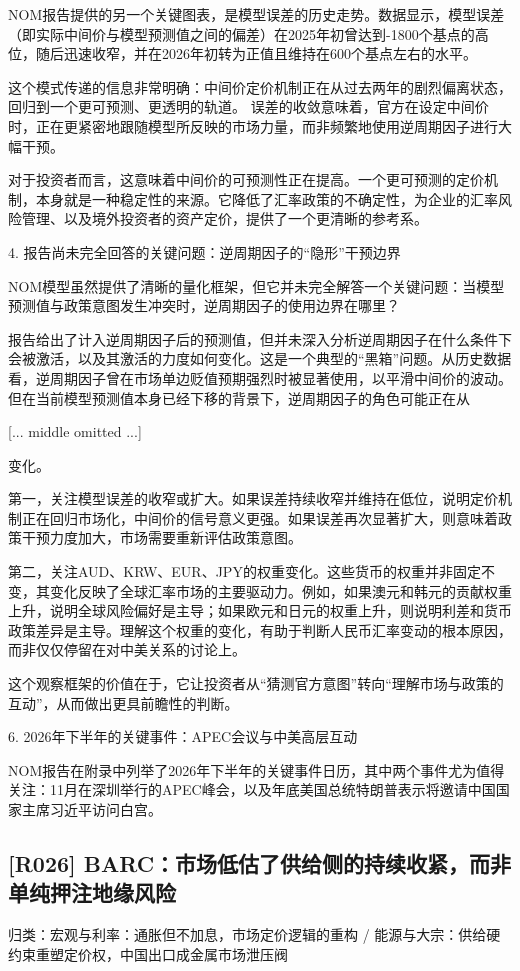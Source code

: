 \documentclass[11pt]{ctexart}
\begin{document}
NOM报告提供的另一个关键图表，是模型误差的历史走势。数据显示，模型误差（即实际中间价与模型预测值之间的偏差）在2025年初曾达到-1800个基点的高位，随后迅速收窄，并在2026年初转为正值且维持在600个基点左右的水平。

这个模式传递的信息非常明确：中间价定价机制正在从过去两年的剧烈偏离状态，回归到一个更可预测、更透明的轨道。 误差的收敛意味着，官方在设定中间价时，正在更紧密地跟随模型所反映的市场力量，而非频繁地使用逆周期因子进行大幅干预。

对于投资者而言，这意味着中间价的可预测性正在提高。一个更可预测的定价机制，本身就是一种稳定性的来源。它降低了汇率政策的不确定性，为企业的汇率风险管理、以及境外投资者的资产定价，提供了一个更清晰的参考系。

4. 报告尚未完全回答的关键问题：逆周期因子的“隐形”干预边界

NOM模型虽然提供了清晰的量化框架，但它并未完全解答一个关键问题：当模型预测值与政策意图发生冲突时，逆周期因子的使用边界在哪里？

报告给出了计入逆周期因子后的预测值，但并未深入分析逆周期因子在什么条件下会被激活，以及其激活的力度如何变化。这是一个典型的“黑箱”问题。从历史数据看，逆周期因子曾在市场单边贬值预期强烈时被显著使用，以平滑中间价的波动。但在当前模型预测值本身已经下移的背景下，逆周期因子的角色可能正在从

[... middle omitted ...]

变化。

第一，关注模型误差的收窄或扩大。如果误差持续收窄并维持在低位，说明定价机制正在回归市场化，中间价的信号意义更强。如果误差再次显著扩大，则意味着政策干预力度加大，市场需要重新评估政策意图。

第二，关注AUD、KRW、EUR、JPY的权重变化。这些货币的权重并非固定不变，其变化反映了全球汇率市场的主要驱动力。例如，如果澳元和韩元的贡献权重上升，说明全球风险偏好是主导；如果欧元和日元的权重上升，则说明利差和货币政策差异是主导。理解这个权重的变化，有助于判断人民币汇率变动的根本原因，而非仅仅停留在对中美关系的讨论上。

这个观察框架的价值在于，它让投资者从“猜测官方意图”转向“理解市场与政策的互动”，从而做出更具前瞻性的判断。

6. 2026年下半年的关键事件：APEC会议与中美高层互动

NOM报告在附录中列举了2026年下半年的关键事件日历，其中两个事件尤为值得关注：11月在深圳举行的APEC峰会，以及年底美国总统特朗普表示将邀请中国国家主席习近平访问白宫。

\subsection{[R026] BARC：市场低估了供给侧的持续收紧，而非单纯押注地缘风险}
{\small\color{refgray}归类：宏观与利率：通胀但不加息，市场定价逻辑的重构 / 能源与大宗：供给硬约束重塑定价权，中国出口成金属市场泄压阀}
\end{document}
